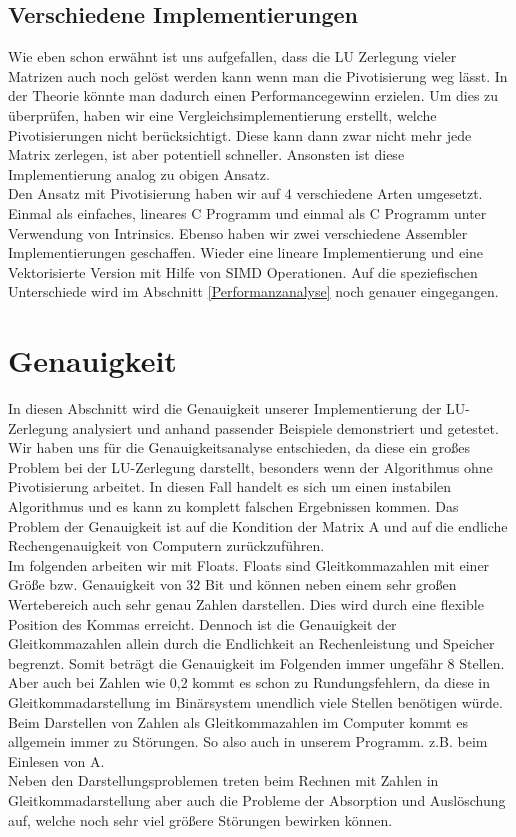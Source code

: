 \documentclass[course=erap]{aspdoc}
\begin{document}
\subsection{Verschiedene Implementierungen}
Wie eben schon erwähnt ist uns aufgefallen, dass die LU Zerlegung vieler Matrizen auch noch gelöst werden kann wenn man 
die Pivotisierung weg lässt. In der Theorie könnte man dadurch einen Performancegewinn erzielen. Um dies zu überprüfen, 
haben wir eine Vergleichsimplementierung erstellt, welche Pivotisierungen nicht berücksichtigt. Diese kann dann zwar nicht 
mehr jede Matrix zerlegen, ist aber potentiell schneller. Ansonsten ist diese Implementierung analog zu obigen Ansatz.\\ 
Den Ansatz mit Pivotisierung haben wir auf 4 verschiedene Arten umgesetzt. Einmal als einfaches, lineares C Programm 
und einmal als C Programm unter Verwendung von Intrinsics. Ebenso haben wir zwei verschiedene Assembler Implementierungen 
geschaffen. Wieder eine lineare Implementierung und eine Vektorisierte Version mit Hilfe von SIMD Operationen.
Auf die speziefischen Unterschiede wird im Abschnitt \ref{Performanzanalyse} noch genauer eingegangen.




\section{Genauigkeit}
In diesen Abschnitt wird die Genauigkeit unserer Implementierung der LU-Zerlegung analysiert und anhand 
passender Beispiele demonstriert und getestet. Wir haben uns für die 
Genauigkeitsanalyse entschieden, da diese ein großes Problem bei der LU-Zerlegung 
darstellt, besonders wenn der Algorithmus ohne Pivotisierung arbeitet. In diesen Fall 
handelt es sich um einen instabilen Algorithmus und es kann zu komplett 
falschen Ergebnissen kommen. Das Problem der Genauigkeit ist auf die Kondition der 
Matrix A und auf die endliche Rechengenauigkeit von Computern zurückzuführen. \\

Im folgenden arbeiten wir mit Floats. Floats sind Gleitkommazahlen mit einer Größe 
bzw. Genauigkeit von 32 Bit und können neben einem sehr großen Wertebereich auch 
sehr genau Zahlen darstellen. Dies wird durch eine flexible Position des Kommas erreicht. 
Dennoch ist die Genauigkeit der Gleitkommazahlen allein durch die Endlichkeit an 
Rechenleistung und Speicher begrenzt. Somit beträgt die 
Genauigkeit im Folgenden immer ungefähr 8 Stellen. Aber auch bei Zahlen wie 
0,2 kommt es schon zu Rundungsfehlern, da diese in Gleitkommadarstellung im Binärsystem unendlich 
viele Stellen benötigen würde. Beim Darstellen von Zahlen als Gleitkommazahlen im Computer 
kommt es allgemein immer zu Störungen. So also auch in unserem Programm. z.B. beim Einlesen von A.\\
Neben den Darstellungsproblemen treten beim Rechnen mit Zahlen in Gleitkommadarstellung aber auch 
die Probleme der Absorption und Auslöschung auf, welche noch sehr viel größere Störungen bewirken können.
\end{document}
